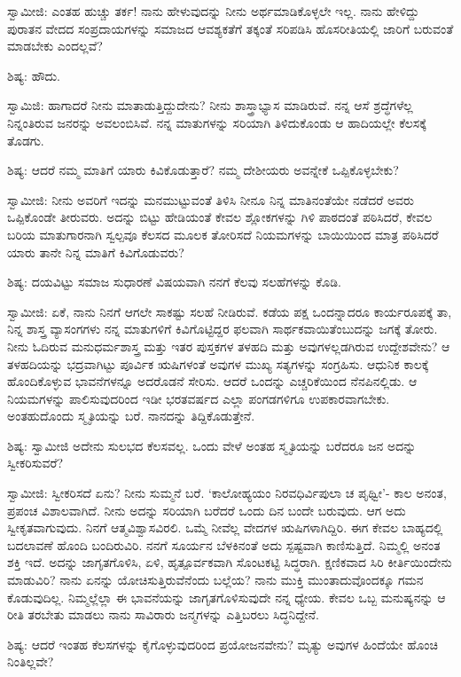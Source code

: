 ಸ್ವಾಮೀಜಿ: ಎಂತಹ ಹುಚ್ಚು ತರ್ಕ! ನಾನು ಹೇಳುವುದನ್ನು ನೀನು ಅರ್ಥಮಾಡಿಕೊಳ್ಳಲೇ ಇಲ್ಲ. ನಾನು ಹೇಳಿದ್ದು ಪುರಾತನ ವೇದದ ಸಂಪ್ರದಾಯಗಳನ್ನು ಸಮಾಜದ ಆವಶ್ಯಕತೆಗೆ ತಕ್ಕಂತೆ ಸರಿಪಡಿಸಿ ಹೊಸರೀತಿಯಲ್ಲಿ ಜಾರಿಗೆ ಬರುವಂತೆ ಮಾಡಬೇಕು ಎಂದಲ್ಲವೆ?

ಶಿಷ್ಯ: ಹೌದು.

ಸ್ವಾಮಿಜಿ: ಹಾಗಾದರೆ ನೀನು ಮಾತಾಡುತ್ತಿದ್ದುದೇನು? ನೀನು ಶಾಸ್ತ್ರಾಭ್ಯಾಸ ಮಾಡಿರುವೆ. ನನ್ನ ಆಸೆ ಶ್ರದ್ಧೆಗಳೆಲ್ಲ ನಿನ್ನಂತಿರುವ ಜನರನ್ನು ಅವಲಂಬಿಸಿವೆ. ನನ್ನ ಮಾತುಗಳನ್ನು ಸರಿಯಾಗಿ ತಿಳಿದುಕೊಂಡು ಆ ಹಾದಿಯಲ್ಲೇ ಕೆಲಸಕ್ಕೆ ತೊಡಗು.

ಶಿಷ್ಯ: ಆದರೆ ನಮ್ಮ ಮಾತಿಗೆ ಯಾರು ಕಿವಿಕೊಡುತ್ತಾರೆ? ನಮ್ಮ ದೇಶೀಯರು ಅವನ್ನೇಕೆ ಒಪ್ಪಿಕೊಳ್ಳಬೇಕು?

ಸ್ವಾಮೀಜಿ: ನೀನು ಅವರಿಗೆ ಇದನ್ನು ಮನಮುಟ್ಟುವಂತೆ ತಿಳಿಸಿ ನೀನೂ ನಿನ್ನ ಮಾತಿನಂತೆಯೇ ನಡೆದರೆ ಅವರು ಒಪ್ಪಿಕೊಂಡೇ ತೀರುವರು. ಅದನ್ನು ಬಿಟ್ಟು ಹೇಡಿಯಂತೆ ಕೇವಲ ಶ್ಲೋಕಗಳನ್ನು ಗಿಳಿ ಪಾಠದಂತೆ ಪಠಿಸಿದರೆ, ಕೇವಲ ಬರಿಯ ಮಾತುಗಾರನಾಗಿ ಸ್ವಲ್ಪವೂ ಕೆಲಸದ ಮೂಲಕ ತೋರಿಸದೆ ನಿಯಮಗಳನ್ನು ಬಾಯಿಯಿಂದ ಮಾತ್ರ ಪಠಿಸಿದರೆ ಯಾರು ತಾನೇ ನಿನ್ನ ಮಾತಿಗೆ ಕಿವಿಗೊಡುವರು?

ಶಿಷ್ಯ: ದಯವಿಟ್ಟು ಸಮಾಜ ಸುಧಾರಣೆ ವಿಷಯವಾಗಿ ನನಗೆ ಕೆಲವು ಸಲಹೆಗಳನ್ನು ಕೊಡಿ.

ಸ್ವಾಮೀಜಿ: ಏಕೆ, ನಾನು ನಿನಗೆ ಆಗಲೇ ಸಾಕಷ್ಟು ಸಲಹೆ ನೀಡಿರುವೆ. ಕಡೆಯ ಪಕ್ಷ ಒಂದನ್ನಾದರೂ ಕಾರ್ಯರೂಪಕ್ಕೆ ತಾ, ನಿನ್ನ ಶಾಸ್ತ್ರ ವ್ಯಾಸಂಗಗಳು ನನ್ನ ಮಾತುಗಳಿಗೆ ಕಿವಿಗೊಟ್ಟಿದ್ದರ ಫಲವಾಗಿ ಸಾರ್ಥಕವಾಯಿತೆಂಬುದನ್ನು ಜಗಕ್ಕೆ ತೋರು. ನೀನು ಓದಿರುವ ಮನುಧರ್ಮಶಾಸ್ತ್ರ ಮತ್ತು ಇತರ ಪುಸ್ತಕಗಳ ತಳಹದಿ ಮತ್ತು ಅವುಗಳಲ್ಲಡಗಿರುವ ಉದ್ದೇಶವೇನು? ಆ ತಳಹದಿಯನ್ನು ಭದ್ರವಾಗಿಟ್ಟು ಪೂರ್ವಿಕ ಋಷಿಗಳಂತೆ ಅವುಗಳ ಮುಖ್ಯ ಸತ್ಯಗಳನ್ನು ಸಂಗ್ರಹಿಸು. ಆಧುನಿಕ ಕಾಲಕ್ಕೆ ಹೊಂದಿಕೊಳ್ಳುವ ಭಾವನೆಗಳನ್ನೂ ಅದರೊಡನೆ ಸೇರಿಸು. ಆದರೆ ಒಂದನ್ನು ಎಚ್ಚರಿಕೆಯಿಂದ ನೆನಪಿನಲ್ಲಿಡು. ಆ ನಿಯಮಗಳನ್ನು ಪಾಲಿಸುವುದರಿಂದ ಇಡೀ ಭರತವರ್ಷದ ಎಲ್ಲಾ ಪಂಗಡಗಳಿಗೂ ಉಪಕಾರವಾಗಬೇಕು. ಅಂತಹುದೊಂದು ಸ್ಮೃತಿಯನ್ನು ಬರೆ. ನಾನದನ್ನು ತಿದ್ದಿಕೊಡುತ್ತೇನೆ.

ಶಿಷ್ಯ: ಸ್ವಾಮೀಜಿ ಅದೇನು ಸುಲಭದ ಕೆಲಸವಲ್ಲ. ಒಂದು ವೇಳೆ ಅಂತಹ ಸ್ಮೃತಿಯನ್ನು ಬರೆದರೂ ಜನ ಅದನ್ನು ಸ್ವೀಕರಿಸುವರೆ?

ಸ್ವಾಮೀಜಿ: ಸ್ವೀಕರಿಸದೆ ಏನು? ನೀನು ಸುಮ್ಮನೆ ಬರೆ. ‘ಕಾಲೋಹ್ಯಯಂ ನಿರವಧಿರ್ವಿಪುಲಾ ಚ ಪೃಥ್ವೀ’- ಕಾಲ ಅನಂತ, ಪ್ರಪಂಚ ವಿಶಾಲವಾಗಿದೆ. ನೀನು ಅದನ್ನು ಸರಿಯಾಗಿ ಬರೆದರೆ ಒಂದು ದಿನ ಬಂದೇ ಬರುವುದು. ಆಗ ಅದು ಸ್ವೀಕೃತವಾಗುವುದು. ನಿನಗೆ ಆತ್ಮವಿಶ್ವಾಸವಿರಲಿ. ಒಮ್ಮೆ ನೀವೆಲ್ಲ ವೇದಗಳ ಋಷಿಗಳಾಗಿದ್ದಿರಿ. ಈಗ ಕೇವಲ ಬಾಹ್ಯದಲ್ಲಿ ಬದಲಾವಣೆ ಹೊಂದಿ ಬಂದಿರುವಿರಿ. ನನಗೆ ಸೂರ್ಯನ ಬೆಳಕಿನಂತೆ ಅದು ಸ್ಪಷ್ಟವಾಗಿ ಕಾಣಿಸುತ್ತಿದೆ. ನಿಮ್ಮಲ್ಲಿ ಅನಂತ ಶಕ್ತಿ ಇದೆ. ಅದನ್ನು ಜಾಗೃತಗೊಳಿಸಿ, ಏಳಿ, ಹೃತ್ಪೂರ್ವಕವಾಗಿ ಸೊಂಟಕಟ್ಟಿ ಸಿದ್ಧರಾಗಿ. ಕ್ಷಣಿಕವಾದ ಸಿರಿ ಕೀರ್ತಿಯಿಂದೇನು ಮಾಡುವಿರಿ? ನಾನು ಏನನ್ನು ಯೋಚಿಸುತ್ತಿರುವೆನೆಂದು ಬಲ್ಲೆಯ? ನಾನು ಮುಕ್ತಿ ಮುಂತಾದುವೊಂದಕ್ಕೂ ಗಮನ ಕೊಡುವುದಿಲ್ಲ. ನಿಮ್ಮಲ್ಲೆಲ್ಲಾ ಈ ಭಾವನೆಯನ್ನು ಜಾಗೃತಗೊಳಿಸುವುದೇ ನನ್ನ ಧ್ಯೇಯ. ಕೇವಲ ಒಬ್ಬ ಮನುಷ್ಯನನ್ನು ಆ ರೀತಿ ತರಬೇತು ಮಾಡಲು ನಾನು ಸಾವಿರಾರು ಜನ್ಮಗಳನ್ನು ಎತ್ತಿಬರಲು ಸಿದ್ಧನಿದ್ದೇನೆ.

ಶಿಷ್ಯ: ಆದರೆ ಇಂತಹ ಕೆಲಸಗಳನ್ನು ಕೈಗೊಳ್ಳುವುದರಿಂದ ಪ್ರಯೋಜನವೇನು? ಮೃತ್ಯು ಅವುಗಳ ಹಿಂದೆಯೇ ಹೊಂಚಿ ನಿಂತಿಲ್ಲವೇ?

